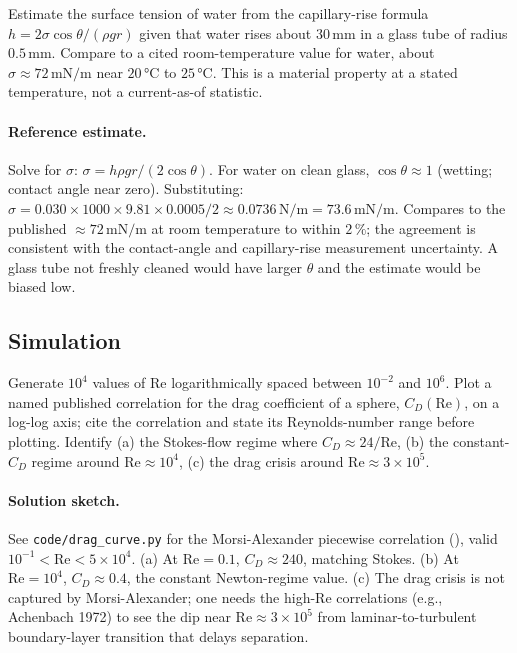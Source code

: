 \begin{exercise}
Estimate the surface tension of water from the capillary-rise
formula $h = 2\sigma\cos\theta / (\rho g r)$ given that water rises
about $30 \,\si{\milli\meter}$ in a glass tube of radius $0.5 \,\si
{\milli\meter}$. Compare to a cited room-temperature value for water,
about $\sigma \approx 72 \,\si{\milli\newton\per\meter}$ near
$20 \,\si{\degreeCelsius}$ to $25 \,\si{\degreeCelsius}$. This is a
material property at a stated temperature, not a current-as-of
statistic.

\paragraph{Reference estimate.}
Solve for $\sigma$: $\sigma = h \rho g r / (2 \cos\theta)$. For
water on clean glass, $\cos\theta \approx 1$ (wetting; contact
angle near zero). Substituting: $\sigma = 0.030 \times 1000 \times
9.81 \times 0.0005 / 2 \approx 0.0736 \,\si{\newton\per\meter}
= 73.6 \,\si{\milli\newton\per\meter}$. Compares to the published
$\approx 72 \,\si{\milli\newton\per\meter}$ at room temperature to
within $2\,\%$; the agreement is consistent with the
contact-angle and capillary-rise measurement uncertainty. A glass
tube not freshly cleaned would have larger $\theta$ and the
estimate would be biased low.
\end{exercise}

\subsection*{Simulation}

\begin{exercise}
Generate $10^{4}$ values of $\mathrm{Re}$ logarithmically spaced
between $10^{-2}$ and $10^{6}$. Plot a named published correlation
for the drag coefficient of a sphere, $C_{D}(\mathrm{Re})$, on a
log-log axis; cite the correlation and state its Reynolds-number
range before plotting. Identify (a) the Stokes-flow regime where
$C_{D} \approx 24 / \mathrm{Re}$, (b) the constant-$C_{D}$ regime
around $\mathrm{Re} \approx 10^{4}$, (c) the drag crisis around
$\mathrm{Re} \approx 3 \times 10^{5}$.

\paragraph{Solution sketch.} See \texttt{code/drag\_curve.py} for the
Morsi-Alexander piecewise correlation (\cite{paper:morsi-alexander-1972}),
valid $10^{-1} < \mathrm{Re} < 5 \times 10^{4}$. (a) At $\mathrm{Re}
= 0.1$, $C_{D} \approx 240$, matching Stokes. (b) At $\mathrm{Re}
= 10^{4}$, $C_{D} \approx 0.4$, the constant Newton-regime value.
(c) The drag crisis is not captured by Morsi-Alexander; one needs
the high-Re correlations (e.g., Achenbach 1972) to see the dip
near $\mathrm{Re} \approx 3 \times 10^{5}$ from laminar-to-turbulent
boundary-layer transition that delays separation.
\end{exercise}

